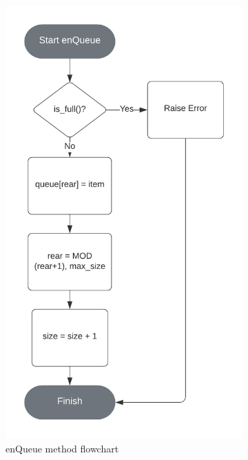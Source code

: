 \documentclass[12pt]{article}
\begin{document}
\begin{figure}[ht]
    \centering
    \begin{subfigure}{.5\textwidth}
        \centering
        \includegraphics[width=.8\linewidth]{enQueue-circular-queue-flowchart}
        \caption{enQueue method flowchart}
    \end{subfigure}%
    \begin{subfigure}{.5\textwidth}
      \centering

\end{subfigure}
\end{figure}
\end{document}
